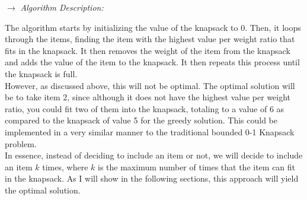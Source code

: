 \documentclass{report}
\begin{document}
\begin{enumerate}
\begin{algorithm}

    \end{algorithm}

    $\to$ \emph{Algorithm Description:} 

    The algorithm starts by initializing the value of the knapsack to 0. Then, it loops through the items, finding the item with the highest value per weight ratio that fits in the knapsack. It then removes the weight of the item from the knapsack and adds the value of the item to the knapsack. It then repeats this process until the knapsack is full. \\

    However, as discussed above, this will not be optimal. The optimal solution will be to take item 2, since although it does not have the highest value per weight ratio, you could fit two of them into the knapsack, totaling to a value of 6 as compared to the knapsack of value 5 for the greedy solution. This could be implemented in a very similar manner to the traditional bounded 0-1 Knapsack problem. \\

    In essence, instead of deciding to include an item or not, we will decide to include an item $k$ times, where $k$ is the maximum number of times that the item can fit in the knapsack. As I will show in the following sections, this approach will yield the optimal solution. \\



\end{enumerate}
\end{document}
